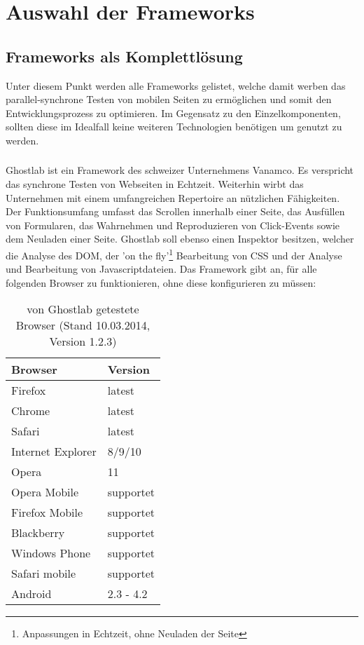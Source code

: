 \chapter{Auswahl der Frameworks}

\section{Frameworks als Komplettlösung}
Unter diesem Punkt werden alle Frameworks gelistet, welche damit werben das parallel-synchrone Testen von mobilen Seiten zu ermöglichen und somit den Entwicklungsprozess zu optimieren. Im Gegensatz zu den Einzelkomponenten, sollten diese im Idealfall keine weiteren Technologien benötigen um genutzt zu werden.
	
	\subsection{}
	Ghostlab ist ein Framework des schweizer Unternehmens Vanamco. Es verspricht das synchrone Testen von Webseiten in Echtzeit. Weiterhin wirbt das Unternehmen mit einem umfangreichen Repertoire an nützlichen Fähigkeiten. Der Funktionsumfang umfasst das Scrollen innerhalb einer Seite, das Ausfüllen von  Formularen, das Wahrnehmen und Reproduzieren von Click-Events sowie dem Neuladen einer Seite. Ghostlab soll ebenso einen Inspektor besitzen, welcher die Analyse des DOM, der 'on the fly'\footnote{Anpassungen in Echtzeit, ohne Neuladen der Seite} Bearbeitung von CSS und der Analyse und Bearbeitung von Javascriptdateien. Das Framework gibt an, für alle folgenden Browser zu funktionieren, ohne diese konfigurieren zu müssen:

	\begin{table}[H]
 		\centering
			\begin{tabular}{| p{5cm} | p{5cm} |}
			
			\hline
				Browser 	& 	Version\\
			\hline
			\hline
				Firefox	&	latest\\
				Chrome	&	latest\\
				Safari	&	latest\\
				Internet Explorer	&	8/9/10\\
				Opera	&	11\\
				Opera Mobile	&	supportet\\
				Firefox Mobile	&	supportet\\
				Blackberry	&	supportet\\
				Windows Phone	&	supportet\\
				Safari mobile	&	supportet\\	
				Android	&	2.3 - 4.2\\
				\hline
				\end{tabular}
			\caption{von Ghostlab getestete Browser (Stand 10.03.2014, Version 1.2.3)}
	\end{table}

